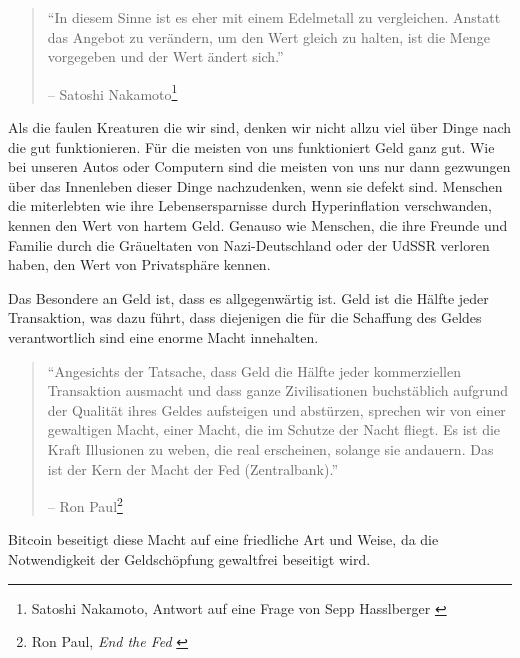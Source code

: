 \begin{quotation}\begin{samepage}
\enquote{In diesem Sinne ist es eher mit einem Edelmetall zu vergleichen.
Anstatt das Angebot zu verändern, um den Wert gleich zu halten, ist die Menge
vorgegeben und der Wert ändert sich.}
\begin{flushright} -- Satoshi Nakamoto\footnote{Satoshi Nakamoto, Antwort auf eine Frage von Sepp
Hasslberger \cite{satoshi-precious-metal}}
\end{flushright}\end{samepage}\end{quotation}

Als die faulen Kreaturen die wir sind, denken wir nicht allzu viel über Dinge
nach die gut funktionieren. Für die meisten von uns funktioniert Geld ganz gut.
Wie bei unseren Autos oder Computern sind die meisten von uns nur dann gezwungen über
das Innenleben dieser Dinge nachzudenken, wenn sie defekt sind. Menschen die
miterlebten wie ihre Lebensersparnisse durch Hyperinflation verschwanden, kennen
den Wert von hartem Geld. Genauso wie Menschen, die ihre Freunde und Familie
durch die Gräueltaten von Nazi-Deutschland oder der UdSSR verloren haben, den
Wert von Privatsphäre kennen.

Das Besondere an Geld ist, dass es allgegenwärtig ist. Geld ist die Hälfte jeder
Transaktion, was dazu führt, dass diejenigen die für die Schaffung des Geldes
verantwortlich sind eine enorme Macht innehalten.

\begin{quotation}\begin{samepage}
\enquote{Angesichts der Tatsache, dass Geld die Hälfte jeder kommerziellen
Transaktion ausmacht und dass ganze Zivilisationen buchstäblich aufgrund der
Qualität ihres Geldes aufsteigen und abstürzen, sprechen wir von einer
gewaltigen Macht, einer Macht, die im Schutze der Nacht fliegt. Es ist die Kraft
Illusionen zu weben, die real erscheinen, solange sie andauern. Das ist der Kern
der Macht der Fed (Zentralbank).}
\begin{flushright} -- Ron Paul\footnote{Ron Paul, \textit{End the Fed} \cite{end-the-fed}}
\end{flushright}\end{samepage}\end{quotation}

Bitcoin beseitigt diese Macht auf eine friedliche Art und Weise, da die
Notwendigkeit der Geldschöpfung gewaltfrei beseitigt wird.

